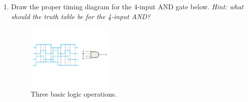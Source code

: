 \documentclass{article}
\begin{document}
\begin{enumerate}
\item Draw the proper timing diagram for the 4-input AND gate below.  \textit{Hint: what should the truth table be for the 4-input AND?}
\begin{figure}[ht]
\centering
\includegraphics[width=0.4\textwidth,trim=0cm 4cm 0cm 4cm,clip=true]{4and.pdf}
\caption{\label{fig:4and} Three basic logic operations.}
\end{figure}
\end{enumerate}
\end{document}
